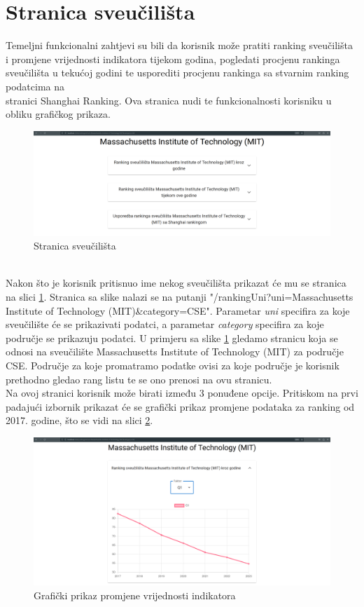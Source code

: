 \documentclass[times, utf8, zavrsni]{fer}
\begin{document}
\section{Stranica sveučilišta}
Temeljni funkcionalni zahtjevi su bili da korisnik može pratiti ranking sveučilišta i promjene vrijednosti indikatora tijekom godina, pogledati procjenu 
rankinga sveučilišta u tekućoj godini te usporediti procjenu rankinga sa stvarnim ranking podatcima na \\stranici Shanghai Ranking. Ova stranica 
nudi te funkcionalnosti korisniku u obliku grafičkog prikaza. 
\\
\begin{figure}[htb]
    \hspace*{-2cm}  
       \includegraphics[scale=0.21]{unipage.png} 
       \caption{Stranica sveučilišta}
       \label{fig:unipage}
       \end{figure}
\\Nakon što je korisnik pritisnuo ime nekog sveučilišta prikazat će mu se stranica na slici \ref{fig:unipage}. Stranica sa slike nalazi se na putanji 
"/rankingUni?uni=Massachusetts Institute of Technology (MIT)\&category=CSE". Parametar \emph{uni} specifira za koje sveučilište će se prikazivati podatci, a 
parametar \emph{category} specifira za koje područje se prikazuju podatci. U primjeru sa slike \ref{fig:unipage} gledamo stranicu koja se odnosi na sveučilište 
Massachusetts Institute of Technology (MIT) za područje CSE. Područje za koje promatramo podatke ovisi za koje područje je korisnik prethodno gledao 
rang listu te se ono prenosi na ovu stranicu. 
\\Na ovoj stranici korisnik može birati između 3 ponuđene opcije. 
Pritiskom na prvi padajući izbornik prikazat će se grafički prikaz promjene podataka za ranking 
od 2017. godine, što se vidi na slici \ref{fig:unipage1}. 
\begin{figure}[htb]
    \hspace*{-2cm}  
       \includegraphics[scale=0.21]{uni1.png} 
       \caption{Grafički prikaz promjene vrijednosti indikatora}
       \label{fig:unipage1}
       \end{figure}
\end{document}
